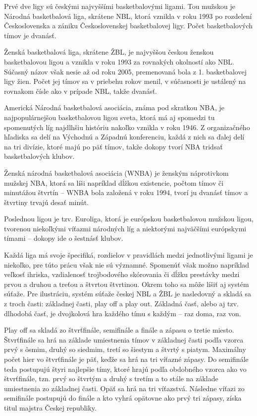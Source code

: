 \documentclass[
  digital, %
  oneside, %
  notable,   %
  lof,     %
  lot,     %
]{fithesis3}
\begin{document}
		Prvé dve ligy sú českými najvyššími basketbalovými ligami. Tou mužskou je Národná basketbalová liga, skrátene NBL, ktorá vznikla v roku 1993 po rozdelení Československa a zániku Československej basketbalovej ligy. Počet basketbalových tímov je dvanásť.
		
		Ženská basketbalová liga, skrátene ŽBL, je najvyššou českou ženskou basketbalovou ligou a 
		vznikla v roku 1993 za rovnakých okolností ako NBL. Súčasný názov však nesie až od roku 2005, premenovaná bola z 1. basketbalovej ligy žien. Počet jej tímov sa v priebehu rokov menil, v súčasnosti je ustálený na rovnakom čísle ako v prípade NBL, takže dvanásť.
		
		Americká Národná basketbalová asociácia, známa pod skratkou NBA, je najpopulárnejšou basketbalovou ligou sveta, ktorá má aj spomedzi tu spomenutých líg najdlhšiu históriu nakoľko vznikla v roku 1946. Z organizačného hľadiska sa delí na Východnú a Západnú konferenciu, každá z nich sa ďalej delí na tri divízie, ktoré majú po päť tímov, takže dokopy tvorí NBA tridsať basketbalových klubov.
		
		Ženská národná basketbalová asociácia (WNBA) je ženským náprotivkom mužskej NBA, ktorá sa líši napríklad dĺžkou existencie, počtom tímov či minutážou štvrtín – WNBA bola založená v roku 1994, tvorí ju dvanásť tímov a štvrtiny trvajú desať minút.
		
		Poslednou ligou je tzv. Euroliga, ktorá je európskou basketbalovou mužskou ligou, tvorenou niekoľkými víťazmi národných líg a  niektorými najväčšími európskymi tímami – dokopy ide o šestnásť klubov. 
		
		Každá liga má svoje špecifiká, rozdielov v pravidlách medzi jednotlivými ligami je niekoľko, pre túto prácu však nie sú významné. Spomenúť však možno napríklad veľkosť ihriska, vzdialenosť trojbodového skórovania či dĺžku prestávky medzi prvou a druhou a treťou a štvrtou štvrtinou. Okrem toho sa môže líšiť aj systém súťaže. Pre ilustráciu, systém súťaže českej NBL a ŽBL je nasledovný a skladá sa z troch časti: základnej časti, play off a play out. Základná časť, alebo aj tzv. dlhodobá časť, je dvojkolová hra každého tímu s každým – raz doma, raz von. 
		
		Play off sa skladá zo štvrťfinále, semifinále a finále a zápasu o tretie miesto. Štvrťfinále sa hrá na základe umiestnenia tímov v základnej časti podľa vzorca prvý s ôsmim, druhý so siedmim, tretí so šiestym a štvrtý s piatym. Maximálny počet hier vo štvrťfinále je päť, keďže sa hrá na tri víťazné zápasy. Do semifinále teda postupujú štyri najlepšie tímy, ktoré hrajú podľa obdobného vzorca ako vo štvrťfinále, tzn. prvý so štvrtým a druhý s tretím a to stále na základe umiestnenia zo základnej časti. Opäť sa hrá na tri víťazstvá. Následne víťazi zo semifinále postupujú do finále a kto vyhrá opätovne ako prvý tri zápasy, získa titul majstra Českej republiky.
		
\end{document}
